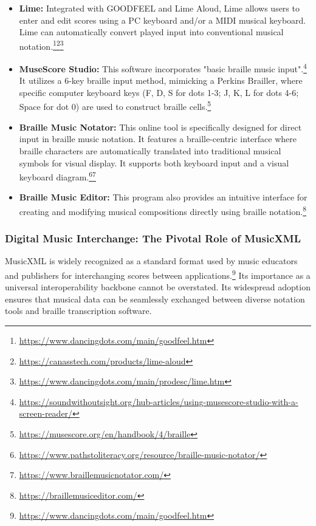 \begin{itemize}[noitemsep,topsep=0pt]
    \item \textbf{Lime:} Integrated with GOODFEEL and Lime Aloud, Lime allows users to enter and edit scores using a PC keyboard and/or a MIDI musical keyboard. Lime can automatically convert played input into conventional musical notation.\footnote{\url{https://www.dancingdots.com/main/goodfeel.htm}}\footnote{\url{https://canasstech.com/products/lime-aloud}}\footnote{\url{https://www.dancingdots.com/main/prodesc/lime.htm}}
    \item \textbf{MuseScore Studio:} This software incorporates "basic braille music input".\footnote{\url{https://soundwithoutsight.org/hub-articles/using-musescore-studio-with-a-screen-reader/}} It utilizes a 6-key braille input method, mimicking a Perkins Brailler, where specific computer keyboard keys (F, D, S for dots 1-3; J, K, L for dots 4-6; Space for dot 0) are used to construct braille cells.\footnote{\url{https://musescore.org/en/handbook/4/braille}}
    \item \textbf{Braille Music Notator:} This online tool is specifically designed for direct input in braille music notation. It features a braille-centric interface where braille characters are automatically translated into traditional musical symbols for visual display. It supports both keyboard input and a visual keyboard diagram.\footnote{\url{https://www.pathstoliteracy.org/resource/braille-music-notator/}}\footnote{\url{https://www.braillemusicnotator.com/}}
    \item \textbf{Braille Music Editor:} This program also provides an intuitive interface for creating and modifying musical compositions directly using braille notation.\footnote{\url{https://braillemusiceditor.com/}}
\end{itemize}

\subsubsection{Digital Music Interchange: The Pivotal Role of MusicXML}
MusicXML is widely recognized as a standard format used by music educators and publishers for interchanging scores between applications.\footnote{\url{https://www.dancingdots.com/main/goodfeel.htm}} Its importance as a universal interoperability backbone cannot be overstated. Its widespread adoption ensures that musical data can be seamlessly exchanged between diverse notation tools and braille transcription software.

